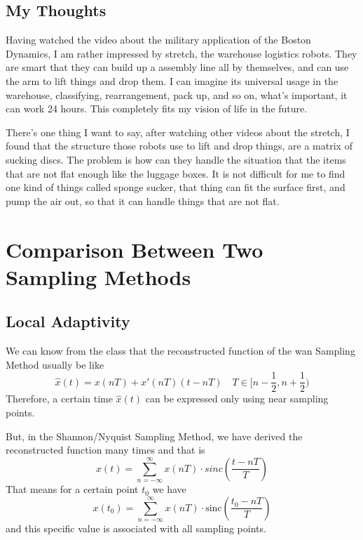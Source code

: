 \documentclass{article}
\begin{document}
\subsection{My Thoughts}
Having watched the video about the military application of the Boston Dynamics, I am rather impressed by stretch, the warehouse logistics robots. They are smart that they can build up a assembly line all by themselves, and can use the arm to lift things and drop them. I can imagine its universal usage in the warehouse, classifying, rearrangement, pack up, and so on, what's important, it can work 24 hours. This completely fits my vision of life in the future. 

There's one thing I want to say, after watching other videos about the stretch, I found that the structure those robots use to lift and drop things, are a matrix of sucking discs. The problem is how can they handle the situation that the items that are not flat enough like the luggage boxes. It is not difficult for me to find one kind of things called sponge sucker, that thing can fit the surface first, and pump the air out, so that it can handle things that are not flat.

\section{Comparison Between Two Sampling Methods}

\subsection{Local Adaptivity}
We can know from the class that the reconstructed function of the wan Sampling Method usually be like
\begin{equation}
	\hat{x}(t) = x(nT) + x'(nT)(t - nT) \quad T \in [n - \frac12, n + \frac12)
	\label{eq:WanReconstruct}
\end{equation}
Therefore, a certain time $\hat{x}(t)$ can be expressed only using near sampling points.

But, in the Shannon/Nyquist Sampling Method, we have derived the reconstructed function many times and that is
\begin{equation}
	x(t) = \sum_{n = - \infty}^{\infty} x(nT) \cdot sinc(\frac{t - nT}{T})
\end{equation}
That means for a certain point $t_0$ we have 
\begin{equation}
	x(t_0) = \sum_{n = - \infty}^{\infty} x(nT) \cdot \mathrm{sinc}(\frac{t_0 - nT}{T})
	\label{eq:SN-Recon}
\end{equation}
and this specific value is associated with all sampling points.
\end{document}
